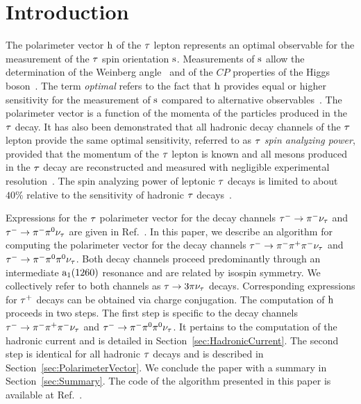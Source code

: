 \section{Introduction}
\label{sec:Introduction}

The polarimeter vector $\textrm{h}$ of the $\tau$ lepton represents an optimal observable for the measurement of the $\tau$ spin orientation $\textrm{s}$.
Measurements of $\textrm{s}$ allow the determination of the Weinberg angle~\cite{ALEPH:2001uca,DELPHI:1999yne,L3:1998oan,OPAL:2001brm,ATLAS:2017xuc,CMS:2023mgq} and of the $CP$ properties of the Higgs boson~\cite{ATLAS:2022akr,CMS:2021sdq}.
The term {\em optimal} refers to the fact that $\textrm{h}$ provides equal or higher sensitivity for the measurement of $\textrm{s}$ compared to alternative observables~\cite{Davier:1992nw}.
The polarimeter vector is a function of the momenta of the particles produced in the $\tau$ decay.
It has also been demonstrated that all hadronic decay channels of the $\tau$ lepton provide the same optimal sensitivity, referred to as {\em $\tau$ spin analyzing power}, provided that the momentum of the $\tau$ lepton is known and all mesons produced in the $\tau$ decay are reconstructed and measured with negligible experimental resolution~\cite{Kuhn:1995nn}. The spin analyzing power of leptonic $\tau$ decays is limited to about $40\%$ relative to the sensitivity of hadronic $\tau$ decays~\cite{Davier:1992nw}.

Expressions for the $\tau$ polarimeter vector for the decay channels $\tau^{-} \to \pi^{-}\nu_{\tau}$ and $\tau^{-} \to \pi^{-}\pi^{\textrm{0}}\nu_{\tau}$ are given in Ref.~\cite{Jadach:1990mz}. 
In this paper, we describe an algorithm for computing the polarimeter vector for the decay channels $\tau^{-} \to \pi^{-}\pi^{+}\pi^{-}\nu_{\tau}$ and $\tau^{-} \to \pi^{-}\pi^{\textrm{0}}\pi^{\textrm{0}}\nu_{\tau}$. Both decay channels proceed predominantly through an intermediate $\textrm{a}_{1}\textrm{(1260)}$ resonance and are related by isospin symmetry.
We collectively refer to both channels as $\tau \to 3 \pi\nu_{\tau}$ decays.
Corresponding expressions for $\tau^{+}$ decays can be obtained via charge conjugation.
The computation of $\textrm{h}$ proceeds in two steps. The first step is specific to the decay channels $\tau^{-} \to \pi^{-}\pi^{+}\pi^{-}\nu_{\tau}$ and $\tau^{-} \to \pi^{-}\pi^{\textrm{0}}\pi^{\textrm{0}}\nu_{\tau}$. It pertains to the computation of the hadronic current and is detailed in Section~\ref{sec:HadronicCurrent}.
The second step is identical for all hadronic $\tau$ decays and is described in Section~\ref{sec:PolarimeterVector}.
We conclude the paper with a summary in Section~\ref{sec:Summary}.
\ifx\ver\verPreprint
The code of the algorithm presented in this paper is available at Ref.~\cite{christian_veelken_2023_8113344}.
\fi

